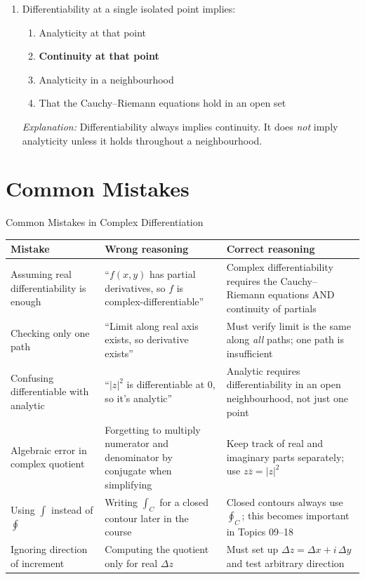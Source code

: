 \documentclass[12pt,a4paper]{article}
\begin{document}
\begin{enumerate}[label=\textbf{MCQ \arabic*.}, leftmargin=3em]
\medskip
\item Differentiability at a single isolated point implies:
\begin{enumerate}[label=(\alph*)]
  \item Analyticity at that point
  \item \textbf{Continuity at that point}
  \item Analyticity in a neighbourhood
  \item That the Cauchy--Riemann equations hold in an open set
\end{enumerate}
\textit{Explanation:} Differentiability always implies continuity. It does \emph{not}
imply analyticity unless it holds throughout a neighbourhood.

\end{enumerate}

\section{Common Mistakes}

\begin{mistakebox}{Common Mistakes in Complex Differentiation}
\begin{center}
\begin{tabular}{@{}p{5cm}p{4.5cm}p{5cm}@{}}
\toprule
\textbf{Mistake} & \textbf{Wrong reasoning} & \textbf{Correct reasoning} \\
\midrule
Assuming real differentiability is enough &
``$f(x,y)$ has partial derivatives, so $f$ is complex-differentiable'' &
Complex differentiability requires the Cauchy--Riemann equations AND continuity of partials \\
\midrule
Checking only one path &
``Limit along real axis exists, so derivative exists'' &
Must verify limit is the same along \emph{all} paths; one path is insufficient \\
\midrule
Confusing differentiable with analytic &
``$|z|^2$ is differentiable at $0$, so it's analytic'' &
Analytic requires differentiability in an open neighbourhood, not just one point \\
\midrule
Algebraic error in complex quotient &
Forgetting to multiply numerator and denominator by conjugate when simplifying &
Keep track of real and imaginary parts separately; use $z\overline{z} = |z|^2$ \\
\midrule
Using $\int$ instead of $\oint$ &
Writing $\int_C$ for a closed contour later in the course &
Closed contours always use $\oint_C$; this becomes important in Topics 09--18 \\
\midrule
Ignoring direction of increment &
Computing the quotient only for real $\Delta z$ &
Must set up $\Delta z = \Delta x + i\,\Delta y$ and test arbitrary direction \\
\bottomrule
\end{tabular}
\end{center}
\end{mistakebox}
\end{document}
